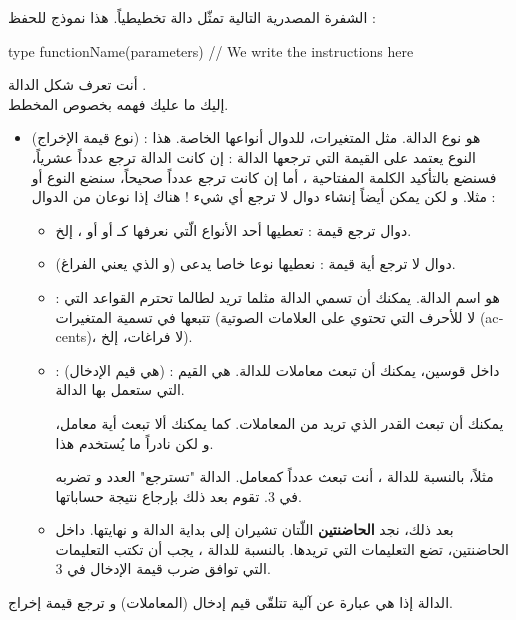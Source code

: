 الشفرة المصدرية التالية تمثّل دالة تخطيطياً. هذا نموذج للحفظ :

\begin{Csource}
type functionName(parameters)
{
	// We write the instructions here
}
\end{Csource}

أنت تعرف شكل الدالة
.\\
إليك ما عليك فهمه بخصوص المخطط.

\begin{itemize}
	\item {}
	 (نوع قيمة الإخراج) : 
	هو نوع الدالة. مثل المتغيرات، للدوال أنواعها الخاصة. هذا النوع يعتمد على القيمة التي ترجعها الدالة : إن كانت الدالة ترجع عدداً عشرياً، فسنضع بالتأكيد الكلمة المفتاحية 
	،
	أما إن كانت ترجع عدداً صحيحاً، سنضع النوع 
	أو 
	مثلا. و لكن يمكن أيضاً إنشاء دوال لا ترجع أي شيء !
	هناك إذا نوعان من الدوال :
	\begin{itemize}
		\item دوال ترجع قيمة : تعطيها أحد الأنواع الّتي نعرفها كـ
		أو 
		أو 
		،
		إلخ.
		\item دوال لا ترجع أية قيمة : نعطيها نوعا خاصا يدعى 
		(و الذي يعني الفراغ).
		\item {} :
		هو اسم الدالة. يمكنك أن تسمي الدالة مثلما تريد لطالما تحترم القواعد التي تتبعها في تسمية المتغيرات (لا للأحرف التي تحتوي على العلامات الصوتية
		(\textenglish{accents})،
		لا فراغات، إلخ).
		\item {} :
		(هي قيم الإدخال) : داخل قوسين، يمكنك أن تبعث معاملات للدالة. هي القيم التي ستعمل بها الدالة.
		\begin{information}
			يمكنك أن تبعث القدر الذي تريد من المعاملات. كما يمكنك ألا تبعث أية معامل، و لكن نادراً ما يُستخدم هذا.
		\end{information}
		
		مثلاً، بالنسبة للدالة 
		،
		أنت تبعث عدداً كمعامل. الدالة "تسترجع" العدد و تضربه في 3. تقوم بعد ذلك بإرجاع نتيجة حساباتها.
		\item بعد ذلك، نجد 
		\textbf{الحاضنتين}
		اللّتان تشيران إلى بداية الدالة و نهايتها. داخل الحاضنتين، تضع التعليمات التي تريدها. بالنسبة للدالة 
		،
		يجب أن تكتب التعليمات التي توافق ضرب قيمة الإدخال في 3.
	\end{itemize}
\end{itemize}
الدالة إذا هي عبارة عن آلية تتلقّى قيم إدخال (المعاملات) و ترجع قيمة إخراج.

